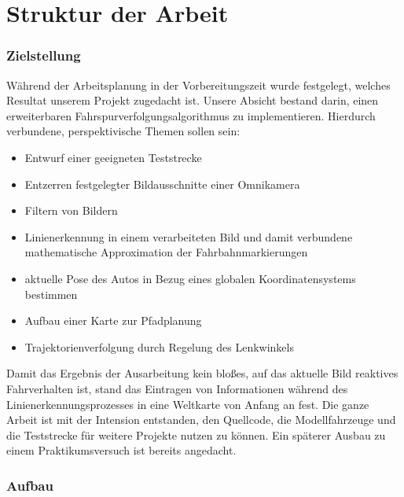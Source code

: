 \section{Struktur der Arbeit}

\subsubsection{Zielstellung}

Während der Arbeitsplanung in der Vorbereitungszeit wurde festgelegt, welches Resultat unserem Projekt zugedacht ist. Unsere Absicht bestand darin, einen erweiterbaren Fahrspurverfolgungsalgorithmus zu implementieren. Hierdurch verbundene, perspektivische Themen sollen sein:

\begin{itemize}
\item Entwurf einer geeigneten Teststrecke
\item Entzerren festgelegter Bildausschnitte einer Omnikamera
\item Filtern von Bildern
\item Linienerkennung in einem verarbeiteten Bild und damit verbundene mathematische Approximation der Fahrbahnmarkierungen
\item aktuelle Pose des Autos in Bezug eines globalen Koordinatensystems bestimmen
\item Aufbau einer Karte zur Pfadplanung
\item Trajektorienverfolgung durch Regelung des Lenkwinkels
\end{itemize}

Damit das Ergebnis der Ausarbeitung kein bloßes, auf das aktuelle Bild reaktives Fahrverhalten ist, stand das Eintragen von Informationen während des Linienerkennungsprozesses in eine Weltkarte von Anfang an fest. Die ganze Arbeit ist mit der Intension entstanden, den Quellcode, die Modellfahrzeuge und die Teststrecke für weitere Projekte nutzen zu können. Ein späterer Ausbau zu einem Praktikumsversuch ist bereits angedacht.

\subsubsection{Aufbau}

